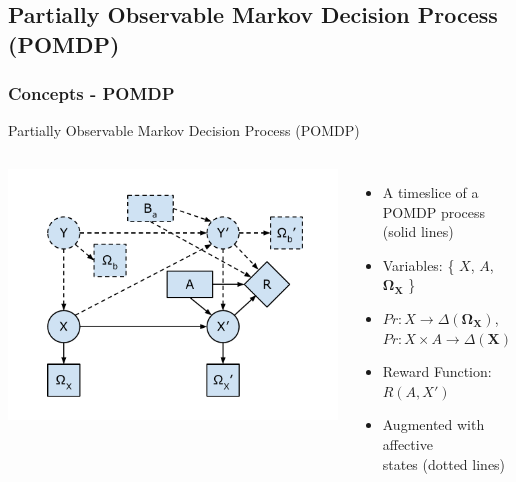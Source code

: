 \documentclass{beamer}
\begin{document}
\subsection{Partially Observable Markov Decision Process (POMDP)}
\begin{frame}
\frametitle{Concepts - POMDP}
Partially Observable Markov Decision Process (POMDP)
\vspace{.3cm}
\begin{columns}[c]
\includegraphics[trim = 15mm 10mm 15mm 10mm, clip, width=\linewidth]{fig/fig-pomdp.pdf}
\begin{itemize}
\item A timeslice of a POMDP process (solid lines)
\pause \item Variables: \{ $X$, $A$, $\mathbf{\Omega_{X}}$ \}
\pause \item $Pr : X \to \Delta(\mathbf{\Omega_{X}})$, $Pr : X \times A \to \Delta(\mathbf{X})$
\pause \item Reward Function: $R(A, X')$
\pause \item Augmented with affective \\ states (dotted lines)
\end{itemize}
\end{columns}
\end{frame}

\end{document}

